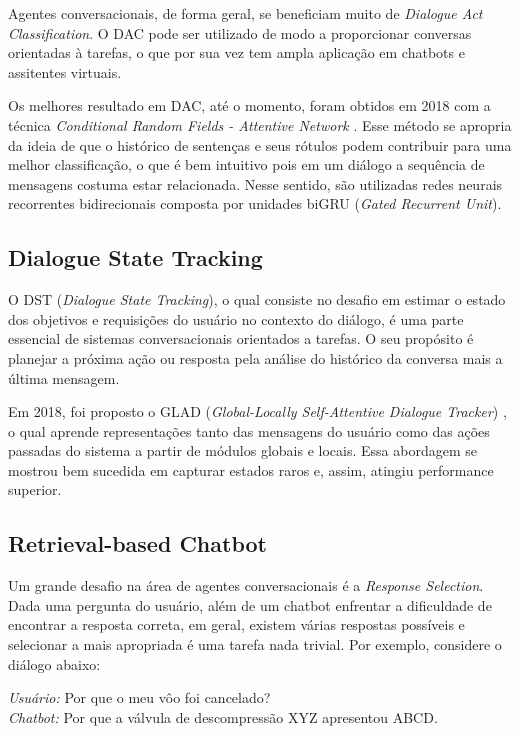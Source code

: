 \documentclass[]{politex}
\begin{document}
Agentes conversacionais, de forma geral, se beneficiam muito de \textit{Dialogue Act Classification}. O DAC pode ser utilizado de modo a proporcionar conversas orientadas à tarefas, o que por sua vez tem ampla aplicação em chatbots e assitentes virtuais. 

Os melhores resultado em DAC, até o momento, foram obtidos em 2018 com a técnica \textit{Conditional Random Fields - Attentive Network} \cite{DBLP:journals/corr/abs-1711-05568}. Esse método se apropria da ideia de que o histórico de sentenças e seus rótulos podem contribuir para uma melhor classificação, o que é bem intuitivo pois em um diálogo a sequência de mensagens costuma estar relacionada. Nesse sentido, são utilizadas redes neurais recorrentes bidirecionais composta por unidades biGRU (\textit{Gated Recurrent Unit}).  

\subsection{Dialogue State Tracking}

O DST (\textit{Dialogue State Tracking}), o qual consiste no desafio em estimar o estado dos objetivos e requisições do usuário no contexto do diálogo, é uma parte essencial de sistemas conversacionais orientados a tarefas. O seu propósito é planejar a próxima ação ou resposta pela análise do histórico da conversa mais a última mensagem.

Em 2018, foi proposto o GLAD (\textit{Global-Locally Self-Attentive Dialogue Tracker}) \cite{DBLP:journals/corr/abs-1805-09655}, o qual aprende representações tanto das mensagens do usuário como das ações passadas do sistema a partir de módulos globais e locais. Essa abordagem se mostrou bem sucedida em capturar estados raros e, assim, atingiu performance superior.  

\subsection{Retrieval-based Chatbot}

Um grande desafio na área de agentes conversacionais é a \textit{Response Selection}. Dada uma pergunta do usuário, além de um chatbot enfrentar a dificuldade de encontrar a resposta correta, em geral, existem várias respostas possíveis e selecionar a mais apropriada é uma tarefa nada trivial. Por exemplo, considere o diálogo abaixo:

\begin{flushleft}
    \textit{Usuário:} Por que o meu vôo foi cancelado? \\
    \textit{Chatbot:} Por que a válvula de descompressão XYZ apresentou ABCD. 
\end{flushleft}
\end{document}
